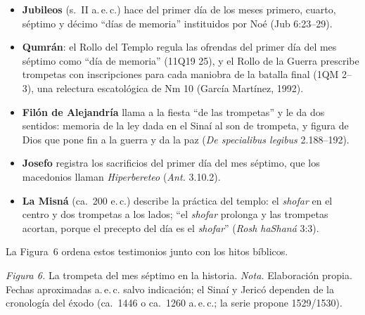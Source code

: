 \documentclass[11pt,letterpaper]{article}
\begin{document}
\begin{itemize}\setlength{\itemsep}{2pt}
\item \textbf{Jubileos} (s.~II a.\,e.\,c.) hace del primer día de los meses primero, cuarto, séptimo y décimo ``días de memoria'' instituidos por Noé (Jub 6:23--29).
\item \textbf{Qumrán}: el Rollo del Templo regula las ofrendas del primer día del mes séptimo como ``día de memoria'' (11Q19 25), y el Rollo de la Guerra prescribe trompetas con inscripciones para cada maniobra de la batalla final (1QM 2--3), una relectura escatológica de Nm 10 (García Martínez, 1992).
\item \textbf{Filón de Alejandría} llama a la fiesta ``de las trompetas'' y le da dos sentidos: memoria de la ley dada en el Sinaí al son de trompeta, y figura de Dios que pone fin a la guerra y da la paz (\emph{De specialibus legibus} 2.188--192).
\item \textbf{Josefo} registra los sacrificios del primer día del mes séptimo, que los macedonios llaman \emph{Hiperbereteo} (\emph{Ant.} 3.10.2).
\item \textbf{La Misná} (ca.~200 e.\,c.) describe la práctica del templo: el \emph{shofar} en el centro y dos trompetas a los lados; ``el \emph{shofar} prolonga y las trompetas acortan, porque el precepto del día es el \emph{shofar}'' (\emph{Rosh haShaná} 3:3).
\end{itemize}

La Figura~6 ordena estos testimonios junto con los hitos bíblicos.

\begin{center}\begin{minipage}{\linewidth}\centering
{}\par
{\footnotesize\color{sepia}\textit{Figura 6.} La trompeta del mes séptimo en la historia. \textit{Nota.} Elaboración propia. Fechas aproximadas a.\,e.\,c. salvo indicación; el Sinaí y Jericó dependen de la cronología del éxodo (ca.~1446 o ca.~1260 a.\,e.\,c.; la serie propone 1529/1530).}
\end{minipage}\end{center}
\end{document}
